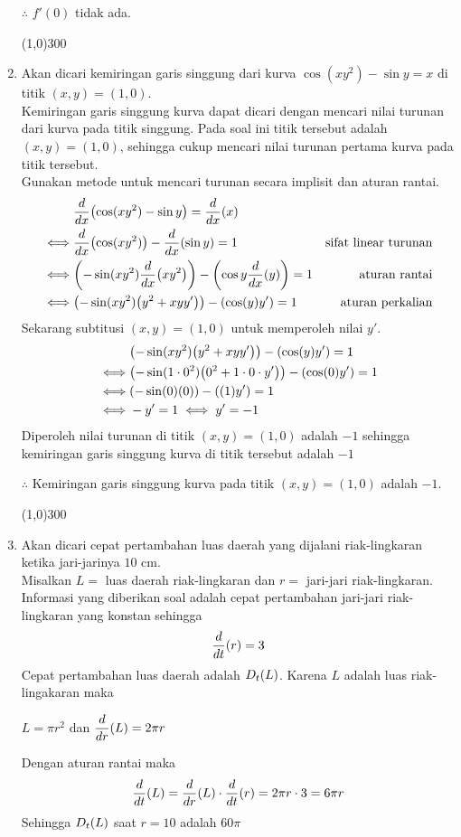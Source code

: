 \begin{enumerate}[leftmargin=*, label={\arabic*}.]
$\therefore$ $f'(0)$ tidak ada.
\begin{center}
    \line(1,0){300}
\end{center}
\item Akan dicari kemiringan garis singgung dari kurva $\cos (xy^{2})-\sin y = x$ di 
titik $(x,y) = (1,0)$.\\
Kemiringan garis singgung kurva dapat dicari dengan mencari nilai turunan dari kurva 
pada titik singgung. Pada soal ini titik tersebut adalah $(x,y) = (1,0)$, sehingga 
cukup mencari nilai turunan pertama kurva pada titik tersebut.\\
Gunakan metode untuk mencari turunan secara implisit dan aturan rantai.
\begin{align*}
    &\drv{x}{\cos (xy^{2})-\sin y} = \drv{x}{x}\\
    \iff &\drv{x}{\cos (xy^{2})} - \drv{x}{\sin y} = 1
    &\text{sifat linear turunan}\\
    \iff &\brk*{-\sin(xy^{2})\drv{x}{xy^{2}}}
    -\brk*{\cos y \drv{x}{y}} = 1
    &\text{aturan rantai}\\
    \iff &\brk*{-\sin (xy^{2})\brk*{y^{2}+xyy'}} 
    -\brk*{\cos (y) y'} = 1
    &\text{aturan perkalian}
\end{align*}
Sekarang subtitusi $(x,y)=(1,0)$ untuk memperoleh nilai $y'$.
\begin{align*}
    &\brk*{-\sin (xy^{2})\brk*{y^{2}+xyy'}} - \brk*{\cos (y) y'} = 1\\
    \iff &\brk*{-\sin (1\cdot 0^{2})\brk*{0^{2}+1\cdot 0\cdot y'}} - \brk*{\cos (0) y'} = 1\\
    \iff &\brk*{-\sin(0)(0)} - \brk*{(1)y'} = 1\\
    \iff &-y' = 1 \iff y'=-1
\end{align*}
Diperoleh nilai turunan di titik $(x,y) = (1,0)$ adalah $-1$ sehingga kemiringan 
garis singgung kurva di titik tersebut adalah $-1$

$\therefore$ Kemiringan garis singgung kurva pada titik $(x,y) = (1,0)$ adalah $-1$.
\begin{center}
    \line(1,0){300}
\end{center}

\item Akan dicari cepat pertambahan luas daerah yang dijalani riak-lingkaran ketika 
jari-jarinya $10$ cm.\\
Misalkan $L=$ luas daerah riak-lingkaran dan $r=$ jari-jari riak-lingkaran.\\
Informasi yang diberikan soal adalah cepat pertambahan jari-jari riak-lingkaran yang 
konstan sehingga 
\[\drv{t}{r} = 3\]
Cepat pertambahan luas daerah adalah $\drvL{t}{L}$. Karena $L$ adalah luas 
riak-lingakaran maka 
\begin{center}
    $L = \pi r^{2}$ dan $\ds \drv{r}{L} = 2\pi r$
\end{center}
Dengan aturan rantai maka
\[
\drv{t}{L} = \drv{r}{L}\cdot\drv{t}{r} = 2\pi r \cdot 3 = 6\pi r
\]
Sehingga $\drvL{t}{L}$ saat $r=10$ adalah $60\pi$


\end{enumerate}
